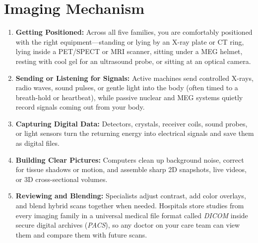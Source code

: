 \section{Imaging Mechanism}
\begin{enumerate}
  \item \textbf{Getting Positioned:} Across all five families, you are comfortably positioned with the right equipment---standing or lying by an X-ray plate or CT ring, lying inside a PET/SPECT or MRI scanner, sitting under a MEG helmet, resting with cool gel for an ultrasound probe, or sitting at an optical camera.
  \item \textbf{Sending or Listening for Signals:} Active machines send controlled X-rays, radio waves, sound pulses, or gentle light into the body (often timed to a breath-hold or heartbeat), while passive nuclear and MEG systems quietly record signals coming out from your body.
  \item \textbf{Capturing Digital Data:} Detectors, crystals, receiver coils, sound probes, or light sensors turn the returning energy into electrical signals and save them as digital files.
  \item \textbf{Building Clear Pictures:} Computers clean up background noise, correct for tissue shadows or motion, and assemble sharp 2D snapshots, live videos, or 3D cross-sectional volumes.
  \item \textbf{Reviewing and Blending:} Specialists adjust contrast, add color overlays, and blend hybrid scans together when needed. Hospitals store studies from every imaging family in a universal medical file format called \emph{DICOM} inside secure digital archives (\emph{PACS}), so any doctor on your care team can view them and compare them with future scans.
\end{enumerate}

